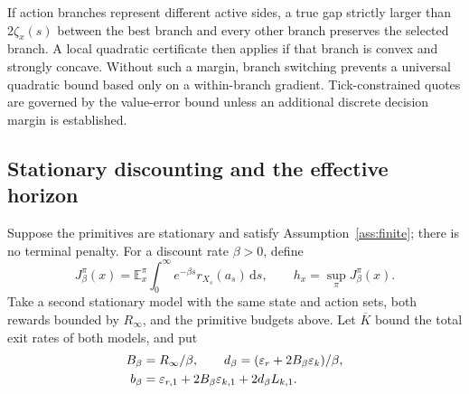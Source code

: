\documentclass[11pt]{article}
\theoremstyle{plain}
\theoremstyle{definition}
\theoremstyle{remark}
\newcommand{\E}{\mathbb E}
\newcommand{\dd}{\,\mathrm d}
\begin{document}
If action branches represent different active sides, a true gap
strictly larger than \(2\zeta_x(s)\) between the best branch and every
other branch preserves the selected branch. A local quadratic
certificate then applies if that branch is convex and strongly concave.
Without such a margin, branch switching prevents a universal quadratic
bound based only on a within-branch gradient. Tick-constrained quotes
are governed by the value-error bound unless an additional discrete
decision margin is established.

\subsection{Stationary discounting and the effective horizon}

Suppose the primitives are stationary and satisfy
Assumption~\ref{ass:finite}; there is no terminal penalty. For a discount
rate \(\beta>0\), define
\[
J_\beta^\pi(x)=\E_x^\pi\int_0^\infty e^{-\beta s}
 r_{X_s}(a_s)\dd s,\qquad h_x=\sup_\pi J_\beta^\pi(x).
\]
Take a second stationary model with the same state and action sets,
both rewards bounded by \(R_\infty\), and the primitive budgets above.
Let \(\overline K\) bound the total exit rates of both models, and put
\begin{align}
B_\beta&=R_\infty/\beta,\qquad
d_\beta=(\varepsilon_r+2B_\beta\varepsilon_k)/\beta,\notag\\
b_\beta&=\varepsilon_{r,1}+2B_\beta\varepsilon_{k,1}
                         +2d_\beta L_{k,1}.\label{eq:discountbudgets}
\end{align}
\end{document}
